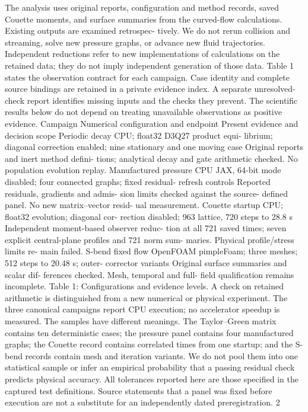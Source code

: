 \documentclass[11pt]{article}
\begin{document}
The analysis uses original reports, configuration and method records, saved Couette moments, and
surface summaries from the curved-flow calculations. Existing outputs are examined retrospec-
tively. We do not rerun collision and streaming, solve new pressure graphs, or advance new fluid
trajectories. Independent reductions refer to new implementations of calculations on the retained
data; they do not imply independent generation of those data.
Table 1 states the observation contract for each campaign. Case identity and complete source
bindings are retained in a private evidence index. A separate unresolved-check report identifies
missing inputs and the checks they prevent. The scientific results below do not depend on treating
unavailable observations as positive evidence.
Campaign Numerical configuration and endpoint Present evidence and decision scope
Periodic decay CPU; float32 D3Q27 product equi-
librium; diagonal correction enabled;
nine stationary and one moving case
Original reports and inert method defini-
tions; analytical decay and gate arithmetic
checked. No population evolution replay.
Manufactured
pressure
CPU JAX, 64-bit mode disabled;
four connected graphs; fixed residual-
refresh controls
Reported residuals, gradients and admis-
sion limits checked against the source-
defined panel. No new matrix–vector resid-
ual measurement.
Couette startup CPU; float32 evolution; diagonal cor-
rection disabled; 963 lattice, 720 steps
to 28.8 s
Independent moment-based observer reduc-
tion at all 721 saved times; seven explicit
central-plane profiles and 721 norm sum-
maries. Physical profile/stress limits re-
main failed.
S-bend fixed flow OpenFOAM pimpleFoam; three
meshes; 512 steps to 20.48 s; outer-
corrector variants
Original surface summaries and scalar dif-
ferences checked. Mesh, temporal and full-
field qualification remains incomplete.
Table 1: Configurations and evidence levels. A check on retained arithmetic is distinguished from
a new numerical or physical experiment. The three canonical campaigns report CPU execution; no
accelerator speedup is measured.
The samples have different meanings. The Taylor–Green matrix contains ten deterministic cases;
the pressure panel contains four manufactured graphs; the Couette record contains correlated times
from one startup; and the S-bend records contain mesh and iteration variants. We do not pool them
into one statistical sample or infer an empirical probability that a passing residual check predicts
physical accuracy. All tolerances reported here are those specified in the captured test definitions.
Source statements that a panel was fixed before execution are not a substitute for an independently
dated preregistration.
2
\end{document}
